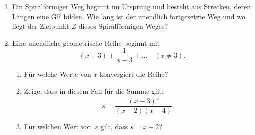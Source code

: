 \begin{ueb}
\begin{enumerate}
\begin{center}
        \end{center}




        \item Ein Spiralförmiger Weg beginnt im Ursprung und besteht aus Strecken, deren Längen eine GF bilden. Wie lang ist der unendlich fortgesetzte Weg und wo liegt der Zielpunkt $Z$ dieses Spiralförmigen Weges?
        \begin{center}
        \end{center}
        

        \item Eine unendliche geometrische Reihe beginnt mit 
        \[
        (x - 3) + \frac{1}{x - 3} + \dots \quad (x \neq 3).
        \]
        
        \begin{enumerate}
            \item Für welche Werte von \( x \) konvergiert die Reihe?
            \item Zeige, dass in diesem Fall für die Summe gilt: 
            \[
            s = \frac{(x - 3)^3}{(x - 2)(x - 4)}.
            \]
            \item Für welchen Wert von \( x \) gilt, dass \( s = x + 2 \)?
        \end{enumerate}
    \end{enumerate}
\end{ueb}


